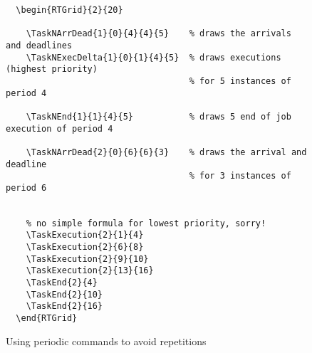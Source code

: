 \documentclass{article}
\begin{document}
\begin{figure}[!htbp]
  \centering
  \begin{RTGrid}{2}{20}
                                   
                                    


    
  \end{RTGrid}

\begin{verbatim}
  \begin{RTGrid}{2}{20}
                                   
    \TaskNArrDead{1}{0}{4}{4}{5}    % draws the arrivals and deadlines
    \TaskNExecDelta{1}{0}{1}{4}{5}  % draws executions (highest priority) 
                                    % for 5 instances of period 4 
                                    
    \TaskNEnd{1}{1}{4}{5}           % draws 5 end of job execution of period 4

   	\TaskNArrDead{2}{0}{6}{6}{3}    % draws the arrival and deadline
                                    % for 3 instances of period 6 
	    
    
    % no simple formula for lowest priority, sorry!
    \TaskExecution{2}{1}{4}
    \TaskExecution{2}{6}{8}
    \TaskExecution{2}{9}{10}
    \TaskExecution{2}{13}{16} 
    \TaskEnd{2}{4}
    \TaskEnd{2}{10}
    \TaskEnd{2}{16}  
  \end{RTGrid}
\end{verbatim}
  \caption{Using periodic commands to avoid repetitions}
  \label{fig:ex1a}
\end{figure}
\end{document}
